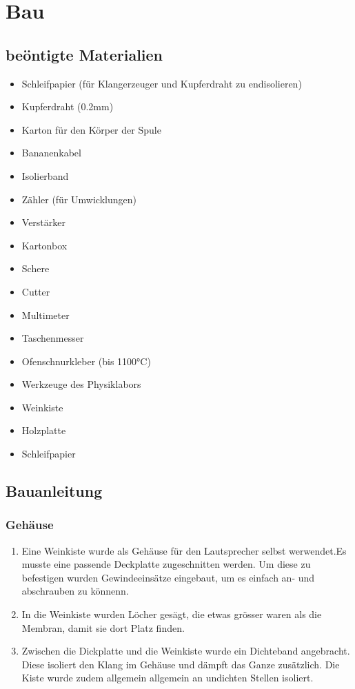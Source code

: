 \documentclass[a4paper,11pt]{report}
\begin{document}
\chapter{Bau}
\section{beöntigte Materialien}
\begin{multicols}{2}
    \begin{itemize}[parsep=0pt]
        \item Schleifpapier (für Klangerzeuger und Kupferdraht zu endisolieren)
        \item Kupferdraht (0.2mm)
        \item Karton für den Körper der Spule
        \item Bananenkabel
        \item Isolierband
        \item Zähler (für Umwicklungen)
        \item Verstärker
        \item Kartonbox
        \item Schere
        \item Cutter
        \item Multimeter
        \item Taschenmesser
        \item Ofenschnurkleber (bis 1100°C)
        \item Werkzeuge des Physiklabors
        \item Weinkiste
        \item Holzplatte
        \item Schleifpapier
    \end{itemize}
\end{multicols}
\section{Bauanleitung}
\subsection{Gehäuse}
\begin{enumerate}
    \item Eine Weinkiste wurde als Gehäuse für den Lautsprecher selbst werwendet.Es musste eine passende Deckplatte zugeschnitten werden. Um diese zu befestigen wurden Gewindeeinsätze eingebaut, um es einfach an- und abschrauben zu könnenn.
    \item In die Weinkiste wurden Löcher gesägt, die etwas grösser waren als die Membran, damit sie dort Platz finden.
    \item Zwischen die Dickplatte und die Weinkiste wurde ein Dichteband angebracht. Diese isoliert den Klang im Gehäuse und dämpft das Ganze zusätzlich.
    Die Kiste wurde zudem allgemein allgemein an undichten Stellen isoliert. 
\end{enumerate}
\end{document}
